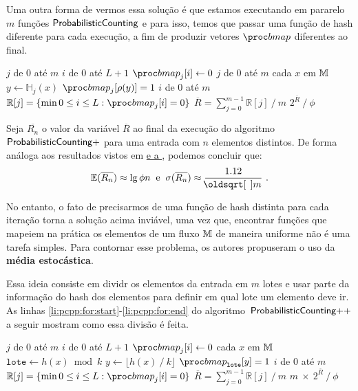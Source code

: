 Uma outra forma de vermos essa solução é que estamos executando em pararelo $m$ funções $\textsf{ProbabilisticCounting}$ e para isso, temos que 
passar uma função de hash diferente para cada execução, a fim de produzir vetores $\bitmap$ diferentes ao final.

\begin{codebox}
  \li \For $j$ de $0$ até $m$
      \Do
  \li    \For $i$ de $0$ até $L + 1$
          \Do
  \li       $\bitmap_{j}[i] \gets 0$
          \End
      \End
  \li \For $j$ de $0$ até $m$
      \Do
  \li    \For cada $x$ em $\mathbb{M}$
          \Do
  \li       $y \gets \mathbb{H}_{j}(x)$
  \li       $\bitmap_j[\rho(y)] = 1$
          \End
      \End
  \li \For $i$ de $0$ até $m$
      \Do
  \li    $\mathbb{R}[j] = \{ \min 0 \leq i \leq L: \bitmap_{j}[i] = 0 \}$
      \End
  \li $\overline{R} = \sum_{j=0}^{m-1} \mathbb{R}[j] \mathbin{/} m$
  \li \Return $2^{\overline{R}} \mathbin{/} \phi$
  \End
\end{codebox}

Seja $\overline{R_n}$ o valor da variável $\overline{R}$ ao final da execução do algoritmo~$\textsf{ProbabilisticCounting}{+}$ para uma
entrada com $n$ elementos distintos. De forma análoga aos resultados vistos em \hyperref[sec:morris:plus]{ 
e a }, podemos concluir que:
\[ \Ebb(\overline{R_n}) \approx \lg \phi n   \; \; \text{e}  \; \; \sigma(\overline{R_n}) \approx \frac{1.12}{\sqrt{m}} \ . \]

No entanto, o fato de precisarmos de uma função de hash distinta para cada iteração torna a solução acima inviável, uma 
vez que, encontrar funções que mapeiem na prática os elementos de um fluxo $\mathbb{M}$ de maneira uniforme não é uma 
tarefa simples. Para contornar esse problema, os autores propuseram o uso da \textbf{média estocástica}.

Essa ideia consiste em dividr os elementos da entrada em $m$ lotes e usar parte da informação do hash dos elementos para 
definir em qual lote um elemento deve ir. As linhas \ref{li:pcpp:for:start}-\ref{li:pcpp:for:end} do algoritmo~$\textsf{ProbabilisticCounting{++}}$ 
a seguir mostram como essa divisão é feita.

\begin{codebox}
  \li \For $j$ de $0$ até $m$
      \Do
  \li    \For $i$ de $0$ até $L + 1$
          \Do
  \li       $\bitmap_{j}[i] \gets 0$
          \End
      \End
  \li \For cada $x$ em $\mathbb{M}$                                                         \label{li:pcpp:for:start}
      \Do
  \li   $\texttt{lote} \gets h(x) \bmod k$
  \li   $y \gets \lfloor h(x) \mathbin{/} k \rfloor$
  \li   $\bitmap_{\texttt{lote}}[y] = 1$                                              \label{li:pcpp:for:end}
      \End
  \li \For $i$ de $0$ até $m$
      \Do
  \li    $\mathbb{R}[j] = \{ \min 0 \leq i \leq L: \bitmap_{j}[i] = 0 \}$             \label{li:pcpp:rmin}
      \End
  \li $\overline{R} = \sum_{j=0}^{m-1} \mathbb{R}[j] \mathbin{/} m$
  \li \Return $m \ \times \ 2^{\overline{R}} \mathbin{/} \phi$
  \End
\end{codebox}

